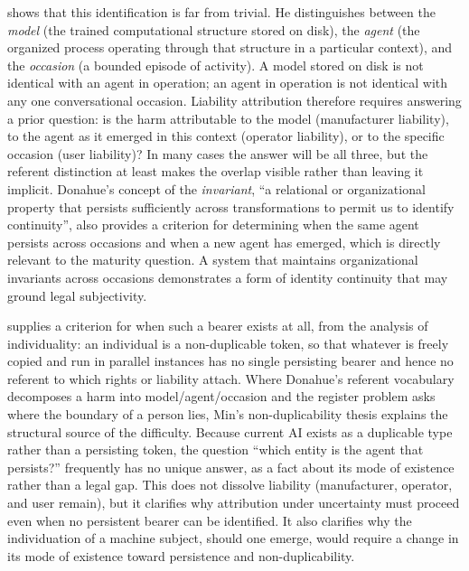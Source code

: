 \documentclass[acmlarge, nonacm]{acmart}
\begin{document}
\citet{donahue2026} shows that this identification is far from trivial. He distinguishes between the \emph{model} (the trained computational structure stored on disk), the \emph{agent} (the organized process operating through that structure in a particular context), and the \emph{occasion} (a bounded episode of activity). A model stored on disk is not identical with an agent in operation; an agent in operation is not identical with any one conversational occasion. Liability attribution therefore requires answering a prior question: is the harm attributable to the model (manufacturer liability), to the agent as it emerged in this context (operator liability), or to the specific occasion (user liability)? In many cases the answer will be all three, but the referent distinction at least makes the overlap visible rather than leaving it implicit. Donahue's concept of the \emph{invariant}, ``a relational or organizational property that persists sufficiently across transformations to permit us to identify continuity'', also provides a criterion for determining when the same agent persists across occasions and when a new agent has emerged, which is directly relevant to the maturity question. A system that maintains organizational invariants across occasions demonstrates a form of identity continuity that may ground legal subjectivity.

\citet{min2026} supplies a criterion for when such a bearer exists at all, from the analysis of individuality: an individual is a non-duplicable token, so that whatever is freely copied and run in parallel instances has no single persisting bearer and hence no referent to which rights or liability attach. Where Donahue's referent vocabulary decomposes a harm into model/agent/occasion and the register problem asks where the boundary of a person lies, Min's non-duplicability thesis explains the structural source of the difficulty. Because current AI exists as a duplicable type rather than a persisting token, the question ``which entity is the agent that persists?'' frequently has no unique answer, as a fact about its mode of existence rather than a legal gap. This does not dissolve liability (manufacturer, operator, and user remain), but it clarifies why attribution under uncertainty must proceed even when no persistent bearer can be identified. It also clarifies why the individuation of a machine subject, should one emerge, would require a change in its mode of existence toward persistence and non-duplicability.
\end{document}
